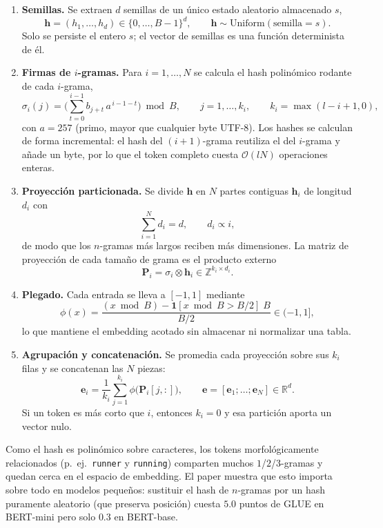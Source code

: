 \begin{enumerate}
\item \textbf{Semillas.} Se extraen $d$ semillas de un único estado aleatorio almacenado $s$,
\[
\mathbf{h} = (h_1,\dots,h_d) \in \{0,\dots,B-1\}^d,
\qquad \mathbf{h} \sim \mathrm{Uniform}(\text{semilla}=s).
\]
Solo se persiste el entero $s$; el vector de semillas es una función determinista de él.

\item \textbf{Firmas de $i$-gramas.} Para $i=1,\dots,N$ se calcula el hash polinómico rodante de cada $i$-grama,
\[
\sigma_i(j) = \Big(\sum_{t=0}^{i-1} b_{j+t}\,a^{\,i-1-t}\Big) \bmod B,
\qquad j=1,\dots,k_i,
\qquad k_i=\max(l-i+1,0),
\]
con $a=257$ (primo, mayor que cualquier byte UTF-8). Los hashes se calculan de forma incremental: el hash del $(i{+}1)$-grama reutiliza el del $i$-grama y añade un byte, por lo que el token completo cuesta $\mathcal{O}(lN)$ operaciones enteras.

\item \textbf{Proyección particionada.} Se divide $\mathbf{h}$ en $N$ partes contiguas $\mathbf{h}_i$ de longitud $d_i$ con
\[
\sum_{i=1}^{N} d_i = d, \qquad d_i \propto i,
\]
de modo que los $n$-gramas más largos reciben más dimensiones. La matriz de proyección de cada tamaño de grama es el producto externo
\[
\mathbf{P}_i = \sigma_i \otimes \mathbf{h}_i \in \mathbb{Z}^{k_i\times d_i}.
\]

\item \textbf{Plegado.} Cada entrada se lleva a $[-1,1]$ mediante
\[
\phi(x) = \frac{(x \bmod B) - \mathbf{1}[x \bmod B > B/2]\;B}{B/2} \in (-1, 1],
\]
lo que mantiene el embedding acotado sin almacenar ni normalizar una tabla.

\item \textbf{Agrupación y concatenación.} Se promedia cada proyección sobre sus $k_i$ filas y se concatenan las $N$ piezas:
\[
\mathbf{e}_i = \frac{1}{k_i}\sum_{j=1}^{k_i} \phi\big(\mathbf{P}_i[j,:]\big),
\qquad
\mathbf{e} = [\mathbf{e}_1;\dots;\mathbf{e}_N] \in \mathbb{R}^{d}.
\]
Si un token es más corto que $i$, entonces $k_i=0$ y esa partición aporta un vector nulo.
\end{enumerate}

Como el hash es polinómico sobre caracteres, los tokens morfológicamente relacionados (p.\ ej.\ \texttt{runner} y \texttt{running}) comparten muchos $1$/$2$/$3$-gramas y quedan cerca en el espacio de embedding. El paper muestra que esto importa sobre todo en modelos pequeños: sustituir el hash de $n$-gramas por un hash puramente aleatorio (que preserva posición) cuesta $5.0$ puntos de GLUE en BERT-mini pero solo $0.3$ en BERT-base.

